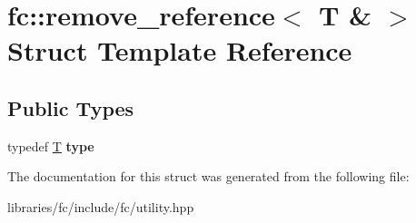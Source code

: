 \hypertarget{structfc_1_1remove__reference_3_01_t_01_6_01_4}{}\section{fc\+:\+:remove\+\_\+reference$<$ T \& $>$ Struct Template Reference}
\label{structfc_1_1remove__reference_3_01_t_01_6_01_4}
\subsection*{Public Types}
\begin{DoxyCompactItemize}
\item 
\mbox{\label{structfc_1_1remove__reference_3_01_t_01_6_01_4_ae53feca31f4eabfdc9192f8d5df3a717}} 
typedef \mbox{\hyperlink{struct_t}{T}} {\bfseries type}
\end{DoxyCompactItemize}


The documentation for this struct was generated from the following file\+:\begin{DoxyCompactItemize}
\item 
libraries/fc/include/fc/utility.\+hpp\end{DoxyCompactItemize}
